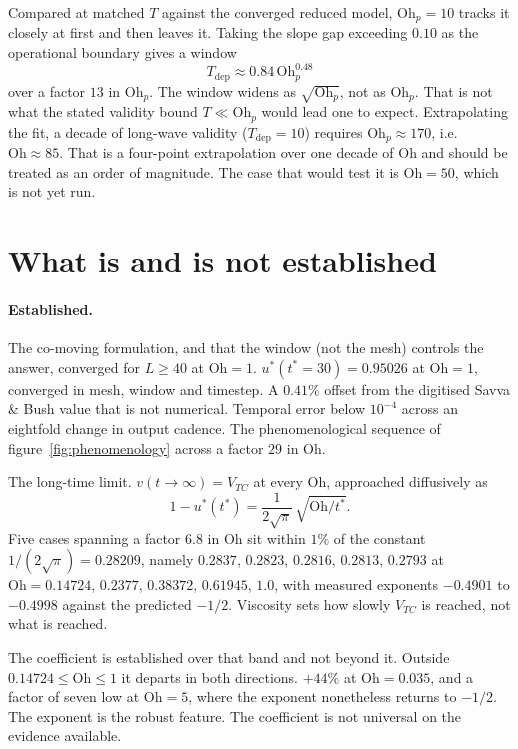 \documentclass[11pt,a4paper]{article}
\newcommand{\Oh}{\mathrm{Oh}}
\newcommand{\Ohp}{\mathrm{Oh}_{p}}
\newcommand{\Vtc}{V_{TC}}
\newcommand{\ustar}{u^{*}}
\newcommand{\tstar}{t^{*}}
\begin{document}
Compared at matched $T$ against the converged reduced model, $\Ohp = 10$ tracks
it closely at first and then leaves it. Taking the slope gap exceeding $0.10$
as the operational boundary gives a window
\begin{equation}
  T_{\mathrm{dep}} \approx 0.84\,\Ohp^{0.48}
\end{equation}
over a factor $13$ in $\Ohp$. The window widens as $\sqrt{\Ohp}$, not as
$\Ohp$. That is not what the stated validity bound $T \ll \Ohp$ would lead one
to expect. Extrapolating the fit, a decade of long-wave validity
($T_{\mathrm{dep}} = 10$) requires $\Ohp \approx 170$, i.e.\ $\Oh \approx 85$.
That is a four-point extrapolation over one decade of $\Oh$ and should
be treated as an order of magnitude. The case that would test it is
$\Oh = 50$, which is not yet run.

\section{What is and is not established}
\label{sec:established}

\paragraph{Established.}
The co-moving formulation, and that the window (not the mesh) controls the
answer, converged for $L \ge 40$ at $\Oh = 1$.
$\ustar(\tstar=30) = 0.95026$ at $\Oh = 1$, converged in mesh, window and
timestep. A $0.41\%$ offset from the digitised Savva \& Bush value that is not
numerical. Temporal error below $10^{-4}$ across an eightfold change in output
cadence. The phenomenological sequence of figure~\ref{fig:phenomenology} across
a factor $29$ in $\Oh$.

The long-time limit. $v(t\to\infty) = \Vtc$ at every $\Oh$, approached
diffusively as
\begin{equation}
  1 - \ustar(\tstar)
  = \frac{1}{2\sqrt{\pi}}\,\sqrt{\Oh/\tstar}.
  \label{eq:deficit}
\end{equation}
Five cases spanning a factor $6.8$ in $\Oh$ sit within $1\%$ of the
constant $1/(2\sqrt{\pi}) = 0.28209$, namely $0.2837$, $0.2823$, $0.2816$,
$0.2813$, $0.2793$ at $\Oh = 0.14724$, $0.2377$, $0.38372$, $0.61945$,
$1.0$, with measured exponents $-0.4901$ to $-0.4998$ against the predicted
$-1/2$. Viscosity sets how slowly $\Vtc$ is reached, not what is reached.

The coefficient is established over that band and not beyond it. Outside
$0.14724 \le \Oh \le 1$ it departs in both directions. $+44\%$ at
$\Oh = 0.035$, and a factor of seven low at $\Oh = 5$, where the exponent
nonetheless returns to $-1/2$. The exponent is the robust feature. The
coefficient is not universal on the evidence available.
\end{document}
